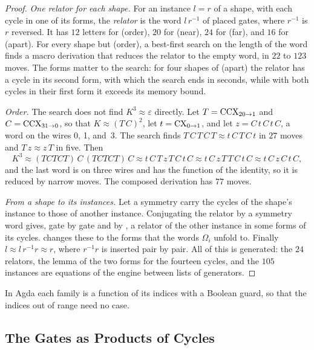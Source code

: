 \documentclass[acmsmall,screen,nonacm]{acmart}
\begin{document}
\begin{proof}
\emph{One relator for each shape.} For an instance $l=r$ of a shape, with each cycle in one of its forms, the \emph{relator} is the word $l\,r^{-1}$ of placed gates, where $r^{-1}$ is $r$ reversed. It has $12$ letters for (order), $20$ for (near), $24$ for (far), and $16$ for (apart). For every shape but (order), a best-first search on the length of the word finds a macro derivation that reduces the relator to the empty word, in $22$ to $123$ moves. The forms matter to the search: for four shapes of (apart) the relator has a cycle in its second form, with which the search ends in seconds, while with both cycles in their first form it exceeds its memory bound.

\emph{Order.} The search does not find $K^3\approx\varepsilon$ directly. Let $T=\mathrm{CCX}_{20\to1}$ and $C=\mathrm{CCX}_{31\to0}$, so that $K\approx(T\,C)^2$, let $t=\mathrm{CX}_{0\to1}$, and let $z=C\,t\,C\,t\,C$, a word on the wires 0, 1, and~3. The search finds $T\,C\,T\,C\,T\approx t\,C\,T\,C\,t$ in $27$ moves and $T\,z\approx z\,T$ in five. Then
\[
K^3\approx(TCTCT)\,C\,(TCTCT)\,C\approx t\,C\,T\,z\,T\,C\,t\,C\approx t\,C\,z\,T\,T\,C\,t\,C\approx t\,C\,z\,C\,t\,C,
\]
and the last word is on three wires and has the function of the identity, so it is reduced by narrow moves. The composed derivation has $77$ moves.

\emph{From a shape to its instances.} Let a symmetry carry the cycles of the shape's instance to those of another instance. Conjugating the relator by a symmetry word gives, gate by gate and by , a relator of the other instance in some forms of its cycles.  changes these to the forms that the words $\Omega_i$ unfold to. Finally $l\approx l\,r^{-1}r\approx r$, where $r^{-1}r$ is inserted pair by pair. All of this is generated: the $24$ relators, the lemma of the two forms for the fourteen cycles, and the $105$ instances are equations of the engine between lists of generators.
\end{proof}

In Agda each family is a function of its indices with a Boolean guard, so that the indices out of range need no case.

\subsection{The Gates as Products of Cycles}\label{app:xcxccx-gates}
\end{document}
